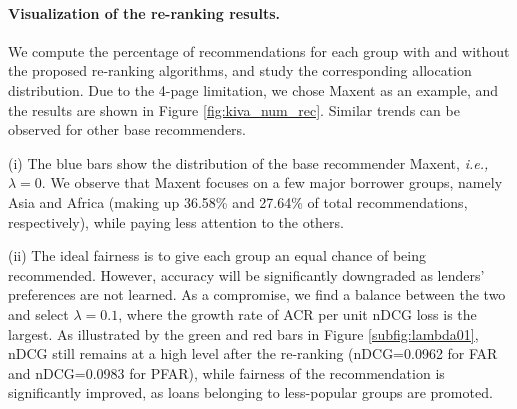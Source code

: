 




\paragraph{Visualization of the re-ranking results.} We compute the percentage of recommendations for each group with and without the proposed re-ranking algorithms, and study the corresponding allocation distribution. Due to the 4-page limitation, we chose Maxent as an example, and the results are shown in Figure \ref{fig:kiva_num_rec}. Similar trends can be observed for other base recommenders.

(i) The blue bars show the distribution of the base recommender Maxent, \emph{i.e.,} $\lambda=0$. We observe that Maxent focuses on a few major borrower groups, namely Asia and Africa (making up 36.58\% and 27.64\% of total recommendations, respectively), while paying less attention to the others. 

(ii) The ideal fairness is to give each group an equal chance of being recommended. However, accuracy will be significantly downgraded as lenders' preferences are not learned. As a compromise, we find a balance between the two and select $\lambda=0.1$, where the growth rate of ACR per unit nDCG loss is the largest. As illustrated by the green and red bars in Figure \ref{subfig:lambda01}, nDCG still remains at a high level after the re-ranking (nDCG=0.0962 for FAR and nDCG=0.0983 for PFAR), while fairness of the recommendation is significantly improved, as loans belonging to less-popular groups are promoted.

